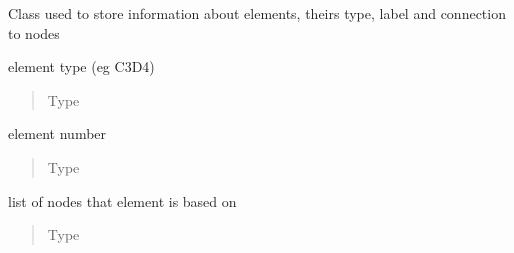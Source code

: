 \documentclass[letterpaper,10pt,english]{sphinxmanual}
\begin{document}

\begin{fulllineitems}
\label{\detokenize{pyCofea/api:cofea.Element}}
Class used to store information about elements,
theirs type, label and connection to nodes

\begin{fulllineitems}
\label{\detokenize{pyCofea/api:cofea.Element.type}}
element type (eg C3D4)
\begin{quote}\begin{description}
\item[{Type}] \leavevmode
{}

\end{description}\end{quote}

\end{fulllineitems}


\begin{fulllineitems}
\label{\detokenize{pyCofea/api:cofea.Element.label}}
element number
\begin{quote}\begin{description}
\item[{Type}] \leavevmode
{}

\end{description}\end{quote}

\end{fulllineitems}


\begin{fulllineitems}
\label{\detokenize{pyCofea/api:cofea.Element.connectivity}}
list of nodes that element is based on
\begin{quote}\begin{description}
\item[{Type}] \leavevmode
{}


\end{description}
\end{quote}
\end{fulllineitems}
\end{fulllineitems}
\end{document}
